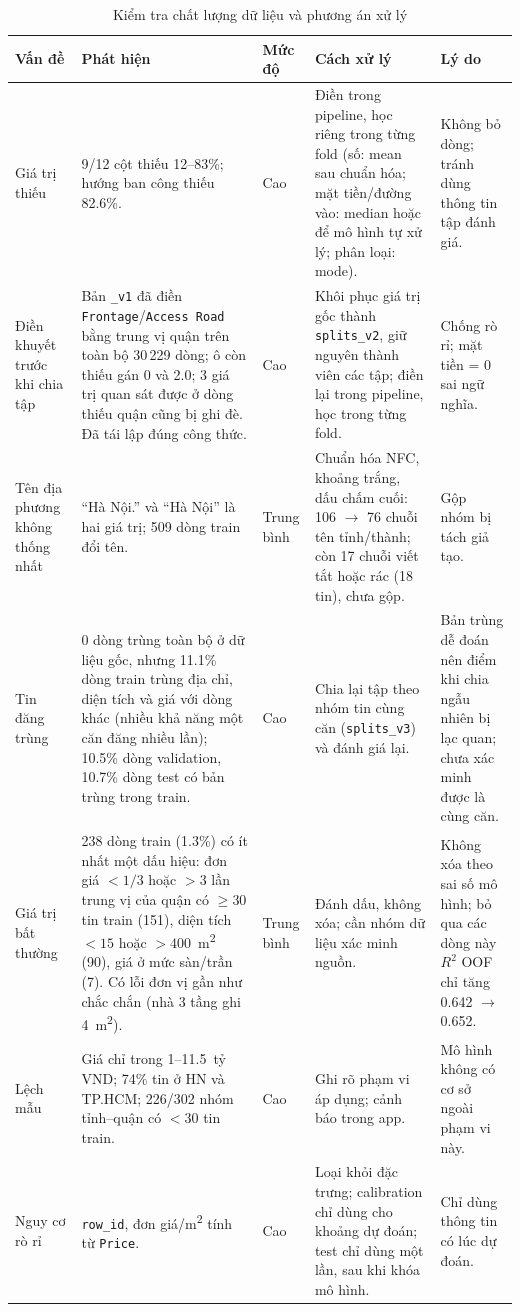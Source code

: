 \documentclass[11pt]{article}
\newcommand{\ty}{tỷ VND}
\newcommand{\mtwo}{m\textsuperscript{2}}
\begin{document}
\begin{table}[H]
\centering
\footnotesize
\caption{Kiểm tra chất lượng dữ liệu và phương án xử lý}
\begin{tabular}{@{}L{0.16\textwidth}L{0.24\textwidth}L{0.09\textwidth}L{0.23\textwidth}L{0.17\textwidth}@{}}
\toprule
\textbf{Vấn đề} & \textbf{Phát hiện} & \textbf{Mức độ} & \textbf{Cách xử lý} & \textbf{Lý do} \\
\midrule
Giá trị thiếu & 9/12 cột thiếu 12--83\%; hướng ban công thiếu 82.6\%. & Cao & Điền trong pipeline, học riêng trong từng fold (số: mean sau chuẩn hóa; mặt tiền/đường vào: median hoặc để mô hình tự xử lý; phân loại: mode). & Không bỏ dòng; tránh dùng thông tin tập đánh giá. \\
Điền khuyết trước khi chia tập & Bản \texttt{\_v1} đã điền \texttt{Frontage}/\texttt{Access Road} bằng trung vị quận trên toàn bộ 30\,229 dòng; ô còn thiếu gán 0 và 2.0; 3 giá trị quan sát được ở dòng thiếu quận cũng bị ghi đè. Đã tái lập đúng công thức. & Cao & Khôi phục giá trị gốc thành \texttt{splits\_v2}, giữ nguyên thành viên các tập; điền lại trong pipeline, học trong từng fold. & Chống rò rỉ; mặt tiền = 0 sai ngữ nghĩa. \\
Tên địa phương không thống nhất & ``Hà Nội.'' và ``Hà Nội'' là hai giá trị; 509 dòng train đổi tên. & Trung bình & Chuẩn hóa NFC, khoảng trắng, dấu chấm cuối: 106 $\rightarrow$ 76 chuỗi tên tỉnh/thành; còn 17 chuỗi viết tắt hoặc rác (18 tin), chưa gộp. & Gộp nhóm bị tách giả tạo. \\
Tin đăng trùng & 0 dòng trùng toàn bộ ở dữ liệu gốc, nhưng 11.1\% dòng train trùng địa chỉ, diện tích và giá với dòng khác (nhiều khả năng một căn đăng nhiều lần); 10.5\% dòng validation, 10.7\% dòng test có bản trùng trong train. & Cao & Chia lại tập theo nhóm tin cùng căn (\texttt{splits\_v3}) và đánh giá lại. & Bản trùng dễ đoán nên điểm khi chia ngẫu nhiên bị lạc quan; chưa xác minh được là cùng căn. \\
Giá trị bất thường & 238 dòng train (1.3\%) có ít nhất một dấu hiệu: đơn giá $< 1/3$ hoặc $> 3$ lần trung vị của quận có $\geq 30$ tin train (151), diện tích $< 15$ hoặc $> 400$~\mtwo{} (90), giá ở mức sàn/trần (7). Có lỗi đơn vị gần như chắc chắn (nhà 3 tầng ghi 4~\mtwo). & Trung bình & Đánh dấu, không xóa; cần nhóm dữ liệu xác minh nguồn. & Không xóa theo sai số mô hình; bỏ qua các dòng này $R^2$ OOF chỉ tăng 0.642 $\rightarrow$ 0.652. \\
Lệch mẫu & Giá chỉ trong 1--11.5~\ty; 74\% tin ở HN và TP.HCM; 226/302 nhóm tỉnh--quận có $< 30$ tin train. & Cao & Ghi rõ phạm vi áp dụng; cảnh báo trong app. & Mô hình không có cơ sở ngoài phạm vi này. \\
Nguy cơ rò rỉ & \texttt{row\_id}, đơn giá/m\textsuperscript{2} tính từ \texttt{Price}. & Cao & Loại khỏi đặc trưng; calibration chỉ dùng cho khoảng dự đoán; test chỉ dùng một lần, sau khi khóa mô hình. & Chỉ dùng thông tin có lúc dự đoán. \\
\bottomrule
\end{tabular}
\end{table}
\end{document}
